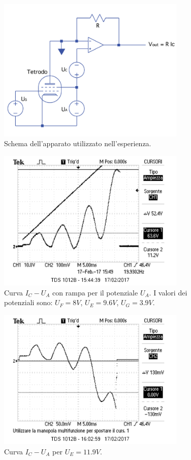 \documentclass[10pt,a4paper]{article}
\begin{document}

\begin{figure}[h!]
	\centering
		\includegraphics[width=0.80\textwidth]{../grafici/schema_apparato.png}
	\caption{Schema dell'apparato utilizzato nell'esperienza.}
	\label{fig:circuito}
\end{figure}


\begin{figure}[h!]
	\centering
		\includegraphics[width=0.80\textwidth]{../oscilloscopio/correnteanodicatempo1.png}
	\caption{Curva $I_{C} - U_{A}$ con rampa per il potenziale $U_{A}$. I valori dei potenziali sono: $U_{F}=8V$, $U_{E}=9.6V$, $U_{G}=3.9V$.}
	\label{andamento}
\end{figure}


\begin{figure}[h!]
	\centering
		\includegraphics[width=0.80\textwidth]{../oscilloscopio/task5.png}
	\caption{Curva $I_{C} - U_{A}$ per $U_{E}=11.9V$.}
	\label{task5}
\end{figure}
\end{document}
